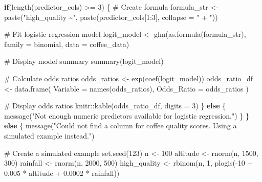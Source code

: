 \documentclass[
  letterpaper,
]{book}
\newenvironment{Shaded}{\begin{snugshade}}{\end{snugshade}}
\newcommand{\AttributeTok}[1]{\textcolor[rgb]{0.40,0.45,0.13}{#1}}
\newcommand{\CommentTok}[1]{\textcolor[rgb]{0.37,0.37,0.37}{#1}}
\newcommand{\ControlFlowTok}[1]{\textcolor[rgb]{0.00,0.23,0.31}{\textbf{#1}}}
\newcommand{\DecValTok}[1]{\textcolor[rgb]{0.68,0.00,0.00}{#1}}
\newcommand{\FloatTok}[1]{\textcolor[rgb]{0.68,0.00,0.00}{#1}}
\newcommand{\FunctionTok}[1]{\textcolor[rgb]{0.28,0.35,0.67}{#1}}
\newcommand{\NormalTok}[1]{\textcolor[rgb]{0.00,0.23,0.31}{#1}}
\newcommand{\OtherTok}[1]{\textcolor[rgb]{0.00,0.23,0.31}{#1}}
\newcommand{\SpecialCharTok}[1]{\textcolor[rgb]{0.37,0.37,0.37}{#1}}
\newcommand{\StringTok}[1]{\textcolor[rgb]{0.13,0.47,0.30}{#1}}
\begin{document}
\begin{Shaded}
\begin{Highlighting}[]
  \ControlFlowTok{if}\NormalTok{(}\FunctionTok{length}\NormalTok{(predictor\_cols) }\SpecialCharTok{\textgreater{}=} \DecValTok{3}\NormalTok{) \{}
    \CommentTok{\# Create formula}
\NormalTok{    formula\_str }\OtherTok{\textless{}{-}} \FunctionTok{paste}\NormalTok{(}\StringTok{"high\_quality \textasciitilde{}"}\NormalTok{, }\FunctionTok{paste}\NormalTok{(predictor\_cols[}\DecValTok{1}\SpecialCharTok{:}\DecValTok{3}\NormalTok{], }\AttributeTok{collapse =} \StringTok{" + "}\NormalTok{))}
    
    \CommentTok{\# Fit logistic regression model}
\NormalTok{    logit\_model }\OtherTok{\textless{}{-}} \FunctionTok{glm}\NormalTok{(}\FunctionTok{as.formula}\NormalTok{(formula\_str), }\AttributeTok{family =}\NormalTok{ binomial, }\AttributeTok{data =}\NormalTok{ coffee\_data)}
    
    \CommentTok{\# Display model summary}
    \FunctionTok{summary}\NormalTok{(logit\_model)}
    
    \CommentTok{\# Calculate odds ratios}
\NormalTok{    odds\_ratios }\OtherTok{\textless{}{-}} \FunctionTok{exp}\NormalTok{(}\FunctionTok{coef}\NormalTok{(logit\_model))}
\NormalTok{    odds\_ratio\_df }\OtherTok{\textless{}{-}} \FunctionTok{data.frame}\NormalTok{(}
      \AttributeTok{Variable =} \FunctionTok{names}\NormalTok{(odds\_ratios),}
      \AttributeTok{Odds\_Ratio =}\NormalTok{ odds\_ratios}
\NormalTok{    )}
    
    \CommentTok{\# Display odds ratios}
\NormalTok{    knitr}\SpecialCharTok{::}\FunctionTok{kable}\NormalTok{(odds\_ratio\_df, }\AttributeTok{digits =} \DecValTok{3}\NormalTok{)}
\NormalTok{  \} }\ControlFlowTok{else}\NormalTok{ \{}
    \FunctionTok{message}\NormalTok{(}\StringTok{"Not enough numeric predictors available for logistic regression."}\NormalTok{)}
\NormalTok{  \}}
\NormalTok{\} }\ControlFlowTok{else}\NormalTok{ \{}
  \FunctionTok{message}\NormalTok{(}\StringTok{"Could not find a column for coffee quality scores. Using a simulated example instead."}\NormalTok{)}
  
  \CommentTok{\# Create a simulated example}
  \FunctionTok{set.seed}\NormalTok{(}\DecValTok{123}\NormalTok{)}
\NormalTok{  n }\OtherTok{\textless{}{-}} \DecValTok{100}
\NormalTok{  altitude }\OtherTok{\textless{}{-}} \FunctionTok{rnorm}\NormalTok{(n, }\DecValTok{1500}\NormalTok{, }\DecValTok{300}\NormalTok{)}
\NormalTok{  rainfall }\OtherTok{\textless{}{-}} \FunctionTok{rnorm}\NormalTok{(n, }\DecValTok{2000}\NormalTok{, }\DecValTok{500}\NormalTok{)}
\NormalTok{  high\_quality }\OtherTok{\textless{}{-}} \FunctionTok{rbinom}\NormalTok{(n, }\DecValTok{1}\NormalTok{, }\FunctionTok{plogis}\NormalTok{(}\SpecialCharTok{{-}}\DecValTok{10} \SpecialCharTok{+} \FloatTok{0.005} \SpecialCharTok{*}\NormalTok{ altitude }\SpecialCharTok{+} \FloatTok{0.0002} \SpecialCharTok{*}\NormalTok{ rainfall))}
  

\end{Highlighting}
\end{Shaded}
\end{document}
